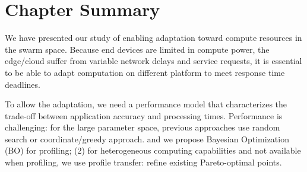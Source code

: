\section{Chapter Summary}
\label{sec:chap-summary}

We have presented our study of enabling adaptation toward compute resources in
the swarm space. Because end devices are limited in compute power, the
edge/cloud suffer from variable network delays and service requests, it is
essential to be able to adapt computation on different platform to meet response
time deadlines.

To allow the adaptation, we need a performance model that characterizes the
trade-off between application accuracy and processing times. Performance is
challenging: for the large parameter space, previous approaches use random
search or coordinate/greedy approach. and we propose Bayesian Optimization (BO)
for profiling; (2) for heterogeneous computing capabilities and not available
when profiling, we use profile transfer: refine existing Pareto-optimal points.

